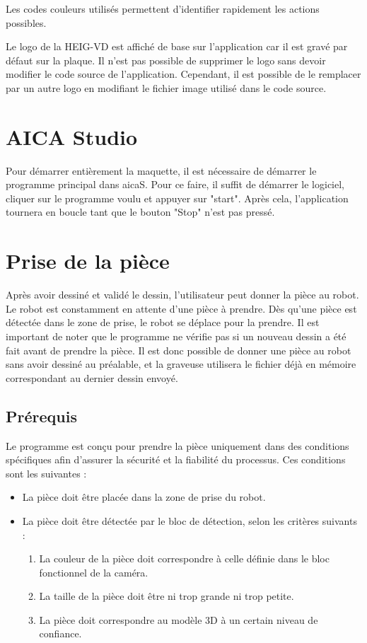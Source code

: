 Les codes couleurs utilisés permettent d'identifier rapidement les actions possibles.

Le logo de la HEIG-VD est affiché de base sur l'application car il est gravé par défaut sur la plaque. Il n'est pas possible de supprimer le logo sans devoir modifier le code source de l'application. Cependant, il est possible de le remplacer par un autre logo en modifiant le fichier image utilisé dans le code source.


\section{AICA Studio}
Pour démarrer entièrement la maquette, il est nécessaire de démarrer le programme principal dans \gls{aicaS}. Pour ce faire, il suffit de démarrer le logiciel, cliquer sur le programme voulu et appuyer sur "start". Après cela, l'application tournera en boucle tant que le bouton "Stop" n'est pas pressé.

\section{Prise de la pièce}

Après avoir dessiné et validé le dessin, l'utilisateur peut donner la pièce au robot. Le robot est constamment en attente d'une pièce à prendre. Dès qu'une pièce est détectée dans le zone de prise, le robot se déplace pour la prendre. Il est important de noter que le programme ne vérifie pas si un nouveau dessin a été fait avant de prendre la pièce. Il est donc possible de donner une pièce au robot sans avoir dessiné au préalable, et la graveuse utilisera le fichier déjà en mémoire correspondant au dernier dessin envoyé.

\subsection{Prérequis}

Le programme est conçu pour prendre la pièce uniquement dans des conditions spécifiques afin d'assurer la sécurité et la fiabilité du processus. Ces conditions sont les suivantes :
\begin{itemize}
    \item La pièce doit être placée dans la zone de prise du robot.
    \item La pièce doit être détectée par le bloc de détection, selon les critères suivants :
          \begin{enumerate}
              \item La couleur de la pièce doit correspondre à celle définie dans le bloc fonctionnel de la caméra.
              \item La taille de la pièce doit être ni trop grande ni trop petite.
              \item La pièce doit correspondre au modèle 3D à un certain niveau de confiance.
          \end{enumerate}
\end{itemize}

